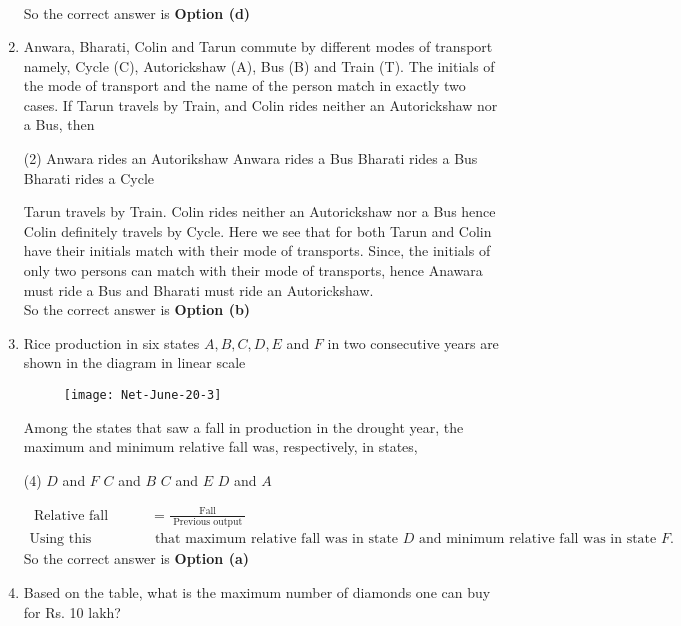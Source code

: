 \begin{enumerate}
\begin{answer}
\begin{align*}
	\end{align*}
		So the correct answer is \textbf{Option (d)}
\end{answer}
\item Anwara, Bharati, Colin and Tarun commute by different modes of transport namely, Cycle (C), Autorickshaw (A), Bus (B) and Train (T). The initials of the mode of transport and the name of the person match in exactly two cases. If Tarun travels by Train, and Colin rides neither an Autorickshaw nor a Bus, then 
 \begin{tasks}(2)
	\task[\textbf{a.}]Anwara rides an Autorikshaw
	\task[\textbf{b.}]Anwara rides a Bus
	\task[\textbf{c.}]Bharati rides a Bus
	\task[\textbf{d.}] Bharati rides a Cycle
\end{tasks}
\begin{answer}
	 Tarun travels by Train. Colin rides neither an Autorickshaw nor a Bus hence Colin definitely travels by Cycle. Here we see that for both Tarun and Colin have their initials match with their mode of transports. Since, the initials of only two persons can match with their mode of transports, hence Anawara must ride a Bus and Bharati must ride an Autorickshaw.\\
	So the correct answer is \textbf{Option (b)}
\end{answer}
\item Rice production in six states $A, B, C, D, E$ and $F$ in two consecutive years are shown in the diagram in linear scale
\begin{figure}[H]
	\centering
	\texttt{[image: Net-June-20-3]}
\end{figure}
Among the states that saw a fall in production in the drought year, the maximum and minimum relative fall was, respectively, in states,
 \begin{tasks}(4)
	\task[\textbf{a.}]$D$ and $F$
	\task[\textbf{b.}]$C$ and $B$
	\task[\textbf{c.}]$C$ and $E$
	\task[\textbf{d.}] $D$ and $A$
\end{tasks}
\begin{answer}
	\begin{align*}
	\text { Relative fall }&=\frac{\text { Fall }}{\text { Previous output }}\\
	\text{Using this relation we see}&\text{ that maximum relative fall was in state $D$ and minimum relative fall was in state $F$.}
	\end{align*}
		So the correct answer is \textbf{Option (a)}
\end{answer}
\item  Based on the table, what is the maximum number of diamonds one can buy for Rs. 10 lakh?\\\\

\end{enumerate}
